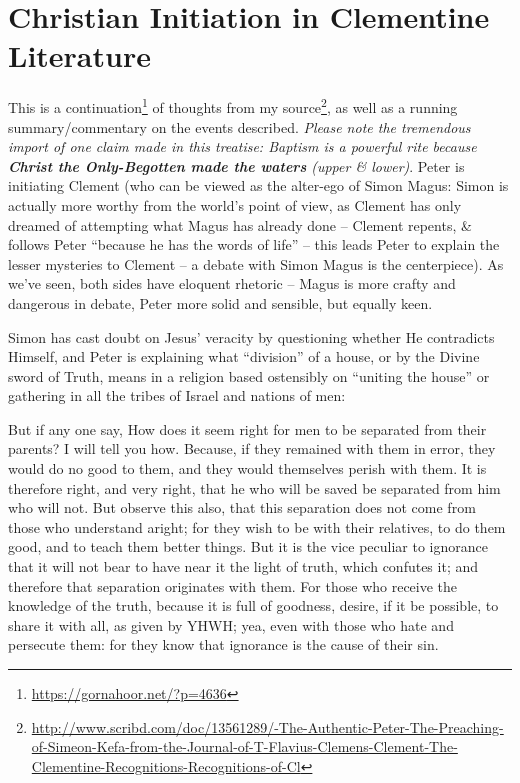 \section{Christian Initiation in Clementine Literature}

This is a continuation\footnote{\url{https://gornahoor.net/?p=4636}} of thoughts from my source\footnote{\url{http://www.scribd.com/doc/13561289/-The-Authentic-Peter-The-Preaching-of-Simeon-Kefa-from-the-Journal-of-T-Flavius-Clemens-Clement-The-Clementine-Recognitions-Recognitions-of-Cl}}, as well as a running summary/commentary on the events described. \emph{Please note the tremendous import of one claim made in this treatise: Baptism is a powerful rite because \textbf{Christ the Only-Begotten made the waters} (upper \& lower)}. Peter is initiating Clement (who can be viewed as the alter-ego of Simon Magus: Simon is actually more worthy from the world's point of view, as Clement has only dreamed of attempting what Magus has already done -- Clement repents, \& follows Peter ``because he has the words of life'' -- this leads Peter to explain the lesser mysteries to Clement -- a debate with Simon Magus is the centerpiece). As we've seen, both sides have eloquent rhetoric -- Magus is more crafty and dangerous in debate, Peter more solid and sensible, but equally keen.

Simon has cast doubt on Jesus' veracity by questioning whether He contradicts Himself, and Peter is explaining what ``division'' of a house, or by the Divine sword of Truth, means in a religion based ostensibly on ``uniting the house'' or gathering in all the tribes of Israel and nations of men:

\begin{quotex}
But if any one say, How does it seem right for men to be separated from their parents? I will tell you how. Because, if they remained with them in error, they would do no good to them, and they would themselves perish with them. It is therefore right, and very right, that he who will be saved be separated from him who will not. But observe this also, that this separation does not come from those who understand aright; for they wish to be with their relatives, to do them good, and to teach them better things. But it is the vice peculiar to ignorance that it will not bear to have near it the light of truth, which confutes it; and therefore that separation originates with them. For those who receive the knowledge of the truth, because it is full of goodness, desire, if it be possible, to share it with all, as given by YHWH; yea, even with those who hate and persecute them: for they know that ignorance is the cause of their sin.
\end{quotex}

